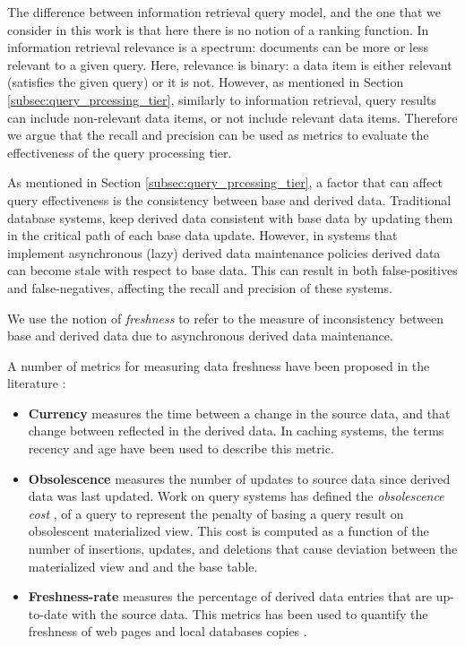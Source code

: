 The difference between information retrieval query model, and the one that we consider in this work is that here there
is no notion of a ranking function.
In information retrieval relevance is a spectrum: documents can be more or less relevant to a given query.
Here, relevance is binary: a data item is either relevant (satisfies the given query) or it is not.
However, as mentioned in Section \ref{subsec:query_prcessing_tier}, similarly to information retrieval, query results
can include non-relevant data items, or not include relevant data items.
Therefore we argue that the recall and precision can be used as metrics to evaluate the effectiveness of the query
processing tier.

As mentioned in Section \ref{subsec:query_prcessing_tier}, a factor that can affect query effectiveness is the
consistency between base and derived data.
Traditional database systems, keep derived data consistent with base data by updating them in the critical path
of each base data update.
However, in systems that implement asynchronous (lazy) derived data maintenance policies \cite{tan:diffindex,
qi:secondaryindexconsistencyanalysis, shukla:schemaagnostic} derived data can become stale with respect to base data.
This can result in both false-positives and false-negatives, affecting the recall and precision of these systems.

We use the notion of \textit{freshness} to refer to the measure of inconsistency between base and derived data due to
asynchronous derived data maintenance.

A number of metrics for measuring data freshness have been proposed in the literature \cite{bouzeghoub:datafreshness}:
\begin{itemize}
  \item \textbf{Currency} measures the time between a change in the source data, and that change between reflected in
  the derived data.
  In caching systems, the terms recency \cite{bright:latencyrecency} and age \cite{cho:dbfreshness}
  have been used to describe this metric.
  \item \textbf{Obsolescence} measures the number of updates to source data since derived data was last updated.
  Work on query systems has defined the \textit{obsolescence cost} \cite{avigdor:obsolescent}, of a query to represent
  the penalty of basing a query result on obsolescent materialized view.
  This cost is computed as a function of the number of insertions, updates, and deletions that cause deviation between
  the materialized view and and the base table.
  \item \textbf{Freshness-rate} measures the percentage of derived data entries that are up-to-date with the source
  data.
  This metrics has been used to quantify the freshness of web pages \cite{labrinidis:balancingperfomancefreshness} and
  local databases copies \cite{cho:dbfreshness}.
\end{itemize}

